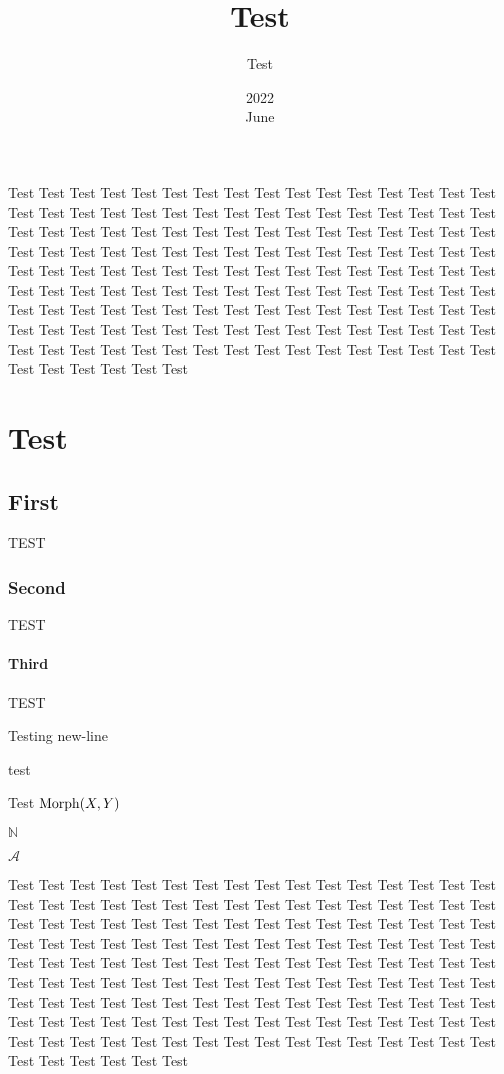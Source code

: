 \documentclass{book*}
\title{Test}
\author{Test}
\date{2022 \\ June}
\begin{document}
\maketitle
\tableofcontents

Test Test Test Test Test Test Test Test Test Test Test Test Test Test Test Test Test Test Test Test Test Test Test Test Test
Test Test Test Test Test Test Test Test Test Test Test Test Test Test Test Test Test Test Test Test Test Test Test Test Test
Test Test Test Test Test Test Test Test Test Test Test Test Test Test Test Test Test Test Test Test Test Test Test Test Test
Test Test Test Test Test Test Test Test Test Test Test Test Test Test Test Test Test Test Test Test Test Test Test Test Test
Test Test Test Test Test Test Test Test Test Test Test Test Test Test Test Test Test Test Test Test Test Test Test Test Test
Test Test Test Test Test Test Test Test Test Test Test Test Test Test Test Test Test Test Test Test Test Test Test Test Test

\chapter{Test}

\section{First}
TEST
\subsection{Second}
TEST
\subsubsection{Third}
TEST


\begin{thm}[Test]
Testing new-line

\begin{lem}[Test1]
test
\end{lem}

\end{thm}

\noindent Test $ \operatorname{Morph}(X,Y) $

$ \mathbb{N} $

$ \mathscr{A} $


\begin{exr}

    Test Test Test Test Test Test Test Test Test Test Test Test Test Test Test Test Test Test Test Test Test Test Test Test Test
    Test Test Test Test Test Test Test Test Test Test Test Test Test Test Test Test Test Test Test Test Test Test Test Test Test
    Test Test Test Test Test Test Test Test Test Test Test Test Test Test Test Test Test Test Test Test Test Test Test Test Test
    Test Test Test Test Test Test Test Test Test Test Test Test Test Test Test Test Test Test Test Test Test Test Test Test Test
    Test Test Test Test Test Test Test Test Test Test Test Test Test Test Test Test Test Test Test Test Test Test Test Test Test
    Test Test Test Test Test Test Test Test Test Test Test Test Test Test Test Test Test Test Test Test Test Test Test Test Test


\end{exr}
\end{document}
